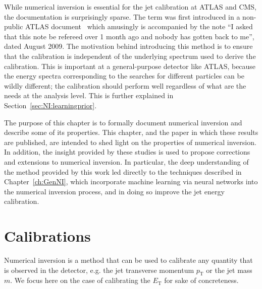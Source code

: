 While numerical inversion is essential for the jet calibration at ATLAS and CMS, the documentation is surprisingly sparse.
The term was first introduced in a non-public ATLAS document~\cite{LopezMateos:1163916} which amusingly is accompanied by the note ``I asked that this note be refereed over 1 month ago and nobody has gotten back to me'', dated August 2009. 
The motivation behind introducing this method is to ensure that the calibration is independent of the underlying spectrum used to derive the calibration.
This is important at a general-purpose detector like ATLAS, because the energy spectra corresponding to the searches for different particles can be wildly different; the calibration should perform well regardless of what are the needs at the analysis level.
This is further explained in Section~\ref{sec:NI:learningprior}.

The purpose of this chapter is to formally document numerical inversion and describe some of its properties. 
This chapter, and the paper in which these results are published, are intended to shed light on the properties of numerical inversion.
In addition, the insight provided by these studies is used to propose corrections and extensions to numerical inversion.
In particular, the deep understanding of the method provided by this work led directly to the techniques described in Chapter~\ref{ch:GenNI}, which incorporate machine learning via neural networks into the numerical inversion process, and in doing so improve the jet energy calibration.

\section{Calibrations}
\label{sec:NI:introclosure}
Numerical inversion is a method that can be used to calibrate any quantity that is observed in the detector, e.g. the jet transverse momentum $p_\text{T}$ or the jet mass $m$.
We focus here on the case of calibrating the $E_\text{T}$ for sake of concreteness.

